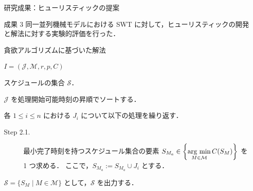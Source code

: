 \documentclass[dvipdfmx]{beamer}
\newcommand{\argmin}{\mathop{\rm arg~min}\limits}
\begin{document}
    \begin{frame}{研究成果：ヒューリスティックの提案}
      \begin{alertblock}{成果 3}
        同一並列機械モデルにおける SWT に対して，ヒューリスティックの開発と解法に対する実験的評価を行った．
      \end{alertblock}
      \begin{block}{貪欲アルゴリズムに基づいた解法}
        \begin{description}
          \setlength{\leftskip}{-10mm}
          \item[入力 :] $I = (\mathcal{J}, \mathcal{M},r,p,C)$
          \item[出力 :] スケジュールの集合 $\mathcal{S}$．
          \begin{description}
            \setlength{\leftskip}{-25mm}
            \item[Step 1.]
            $\mathcal{J}$ を処理開始可能時刻の昇順でソートする．
            \item[Step 2.]
            各 $1 \le i \le n$ における $J_i$ について以下の処理を繰り返す．
            \begin{description}
              \item[Step 2.1.]
              \setlength{\leftskip}{-40mm}
              最小完了時刻を持つスケジュール集合の要素 $S_{M_a} \in \left\{ \displaystyle \argmin_{M \in \mathcal{M}}C(S_M)\right\}$ を 1 つ求める．
              ここで，$S_{M_a} := S_{M_a} \cup J_i$ とする．
            \end{description}
            \item[Step 3.]
            $\mathcal{S} = \{ S_M \mid M \in \mathcal{M}\}$ として，$\mathcal{S}$ を出力する．
          \end{description}
        \end{description}
      \end{block}
    \end{frame}
\end{document}
